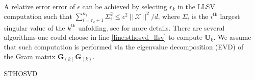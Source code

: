     A relative error error of $\epsilon$ can be achieved by selecting $r_k$ in
    the LLSV computation such that \(\sum_{i=r_k+1}^{n_k}\varSigma_i^2 \leq
    \epsilon^2 \|\mathcal{X}\|^2/d\), where $\varSigma_i$ is the $i^\text{th}$ largest
    singular value of the $k^\text{th}$ unfolding, see \cite{BK25} for more
    details. There are several algorithms one could choose in line
    \ref{line:sthosvd_llsv} to compute $\mathbf{U}_k$. We assume that such
    computation is performed via the eigenvalue decomposition (EVD) of the Gram
    matrix $\mathbf{G}_{(k)}\mathbf{G}_{(k)}$. 

    \begin{algorithm}
        \caption{STHOSVD}
        \label{alg:STHOSVD}
        \begin{algorithmic}
            
                    \label{line:sthosvd_llsv}  
                    \label{line:sthosvd_ttm} 
                \EndFor{}
                \vspace{10pt}
                 
                \vspace{10pt}
                 
            \EndFunction
        \end{algorithmic}
    \end{algorithm}

